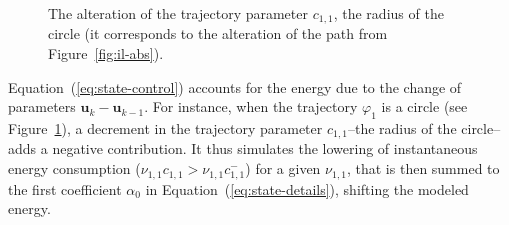 \documentclass[letterpaper,10pt,conference]{ieeeconf}
\newcommand{\figpath}{./figures}
\theoremstyle{definition}
\begin{document}
\begin{figure}[h]
  \centering
  
  \caption{The alteration of the trajectory parameter $c_{1,1}$, the radius of the circle (it corresponds to the alteration of the path from Figure~\ref{fig:il-abs}).}
  \label{fig:tee1}
\end{figure}

Equation~(\ref{eq:state-control}) accounts for the energy due to the change of parameters $\mathbf{u}_k-\mathbf{u}_{k-1}$. For instance, when the trajectory $\varphi_1$ is a circle (see Figure~\ref{fig:tee1}), a decrement in the trajectory parameter $c_{1,1}$--the radius of the circle--adds a negative contribution. It thus simulates the lowering of instantaneous energy consumption ($\nu_{1,1}c_{1,1}>\nu_{1,1}c_{1,1}^-$) for a given $\nu_{1,1}$, that is then summed to the first coefficient $\alpha_0$ in Equation~(\ref{eq:state-details}), shifting the modeled energy.
\end{document}
